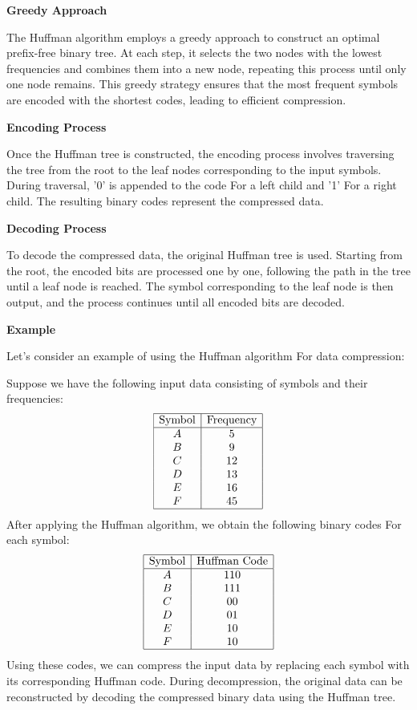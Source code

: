 \documentclass[12pt]{book} %
\begin{document}
\textbf{Greedy Approach}

The Huffman algorithm employs a greedy approach to construct an optimal prefix-free binary tree. At each step, it selects the two nodes with the lowest frequencies and combines them into a new node, repeating this process until only one node remains. This greedy strategy ensures that the most frequent symbols are encoded with the shortest codes, leading to efficient compression.

\textbf{Encoding Process}

Once the Huffman tree is constructed, the encoding process involves traversing the tree from the root to the leaf nodes corresponding to the input symbols. During traversal, '0' is appended to the code For a left child and '1' For a right child. The resulting binary codes represent the compressed data.

\textbf{Decoding Process}

To decode the compressed data, the original Huffman tree is used. Starting from the root, the encoded bits are processed one by one, following the path in the tree until a leaf node is reached. The symbol corresponding to the leaf node is then output, and the process continues until all encoded bits are decoded.

\textbf{Example}

Let's consider an example of using the Huffman algorithm For data compression:

Suppose we have the following input data consisting of symbols and their frequencies:
\FloatBarrier
\[
\begin{array}{|c|c|}
\hline
\text{Symbol} & \text{Frequency} \\
\hline
A & 5 \\
B & 9 \\
C & 12 \\
D & 13 \\
E & 16 \\
F & 45 \\
\hline
\end{array}
\]
\FloatBarrier
After applying the Huffman algorithm, we obtain the following binary codes For each symbol:
\FloatBarrier
\[
\begin{array}{|c|c|}
\hline
\text{Symbol} & \text{Huffman Code} \\
\hline
A & 110 \\
B & 111 \\
C & 00 \\
D & 01 \\
E & 10 \\
F & 10 \\
\hline
\end{array}
\]
\FloatBarrier
Using these codes, we can compress the input data by replacing each symbol with its corresponding Huffman code. During decompression, the original data can be reconstructed by decoding the compressed binary data using the Huffman tree.
\end{document}
